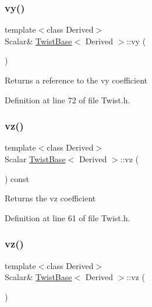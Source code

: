 \subsubsection{\texorpdfstring{vy()}{vy()}\hspace{0.1cm}{\footnotesize\ttfamily [2/2]}}
{\footnotesize\ttfamily template$<$class Derived$>$ \\
Scalar\& \hyperlink{class_twist_base}{Twist\+Base}$<$ Derived $>$\+::vy (\begin{DoxyParamCaption}{ }\end{DoxyParamCaption})\hspace{0.3cm}{\ttfamily [inline]}}

\begin{DoxyReturn}{Returns}
a reference to the {\ttfamily vy} coefficient 
\end{DoxyReturn}


Definition at line 72 of file Twist.\+h.

\hypertarget{class_twist_base_a217ab4d995e5c40b24a586278301415e}{}\label{class_twist_base_a217ab4d995e5c40b24a586278301415e} 
\subsubsection{\texorpdfstring{vz()}{vz()}\hspace{0.1cm}{\footnotesize\ttfamily [1/2]}}
{\footnotesize\ttfamily template$<$class Derived$>$ \\
Scalar \hyperlink{class_twist_base}{Twist\+Base}$<$ Derived $>$\+::vz (\begin{DoxyParamCaption}{ }\end{DoxyParamCaption}) const\hspace{0.3cm}{\ttfamily [inline]}}

\begin{DoxyReturn}{Returns}
the {\ttfamily vz} coefficient 
\end{DoxyReturn}


Definition at line 61 of file Twist.\+h.

\hypertarget{class_twist_base_a169c415ee48933c6820131d211b38eac}{}\label{class_twist_base_a169c415ee48933c6820131d211b38eac} 
\subsubsection{\texorpdfstring{vz()}{vz()}\hspace{0.1cm}{\footnotesize\ttfamily [2/2]}}
{\footnotesize\ttfamily template$<$class Derived$>$ \\
Scalar\& \hyperlink{class_twist_base}{Twist\+Base}$<$ Derived $>$\+::vz (\begin{DoxyParamCaption}{ }\end{DoxyParamCaption})\hspace{0.3cm}{\ttfamily [inline]}}

